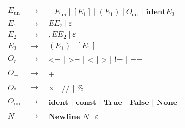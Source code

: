 \documentclass[a4paper, 12pt]{report}
\begin{document}
\begin{figure}[!h]
\begin{center}
{\begin{tabular}{lcl}
$E_\text{un}$ & $\to$ & $- E_\text{un} \ | \  [E_1] \ | \ (E_1) \ | \ O_\text{un}$ | \textbf{ident}$E_3$\\
$E_1$ & $\to$ & $E E_2 \ | \ \varepsilon$\\
$E_2$ & $\to$ & $, E E_2 \ | \ \varepsilon$\\
$E_3$ & $\to$ & $(E_1) \ | \ [E_1]$\\
$O_r$ & $\to$ & <= | >= | < | > | != | ==\\
$O_+$ & $\to$ & + | -\\
$O_*$ & $\to$ & $\times$ | // | \%\\
$O_\text{un}$ & $\to$ &  \textbf{ident} | \textbf{const} | \textbf{True} | \textbf{False} | \textbf{None} \\
$N$ & $\to$ & \textbf{Newline} $N \ | \ \varepsilon$\\
\end{tabular}
}
\end{center}\end{figure}
\end{document}

